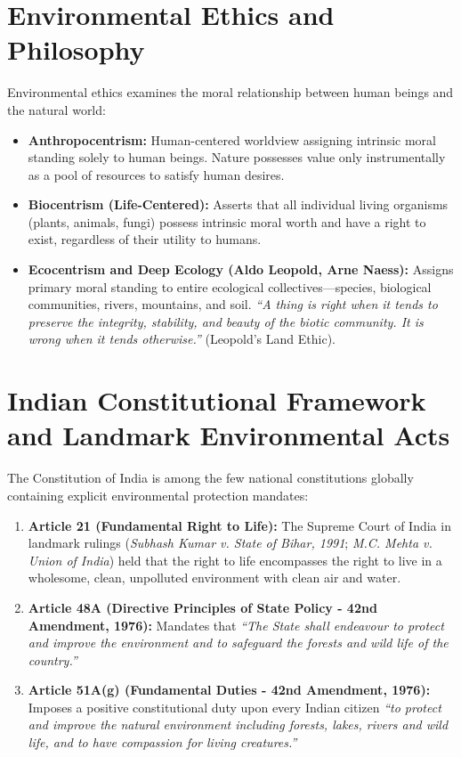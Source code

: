 \section{Environmental Ethics and Philosophy}
Environmental ethics examines the moral relationship between human beings and the natural world:
\begin{itemize}[leftmargin=1.5em]
    \item \textbf{Anthropocentrism:} Human-centered worldview assigning intrinsic moral standing solely to human beings. Nature possesses value only instrumentally as a pool of resources to satisfy human desires.
    \item \textbf{Biocentrism (Life-Centered):} Asserts that all individual living organisms (plants, animals, fungi) possess intrinsic moral worth and have a right to exist, regardless of their utility to humans.
    \item \textbf{Ecocentrism and Deep Ecology (Aldo Leopold, Arne Naess):} Assigns primary moral standing to entire ecological collectives---species, biological communities, rivers, mountains, and soil.
    \textit{``A thing is right when it tends to preserve the integrity, stability, and beauty of the biotic community. It is wrong when it tends otherwise.''} (Leopold's Land Ethic).
\end{itemize}

\section{Indian Constitutional Framework and Landmark Environmental Acts}
The Constitution of India is among the few national constitutions globally containing explicit environmental protection mandates:
\begin{theorem}
\begin{enumerate}[leftmargin=1.2em]
    \item \textbf{Article 21 (Fundamental Right to Life):} The Supreme Court of India in landmark rulings (\textit{Subhash Kumar v. State of Bihar, 1991}; \textit{M.C. Mehta v. Union of India}) held that the right to life encompasses the right to live in a wholesome, clean, unpolluted environment with clean air and water.
    \item \textbf{Article 48A (Directive Principles of State Policy - 42nd Amendment, 1976):} Mandates that \textit{``The State shall endeavour to protect and improve the environment and to safeguard the forests and wild life of the country.''}
    \item \textbf{Article 51A(g) (Fundamental Duties - 42nd Amendment, 1976):} Imposes a positive constitutional duty upon every Indian citizen \textit{``to protect and improve the natural environment including forests, lakes, rivers and wild life, and to have compassion for living creatures.''}
\end{enumerate}
\end{theorem}

